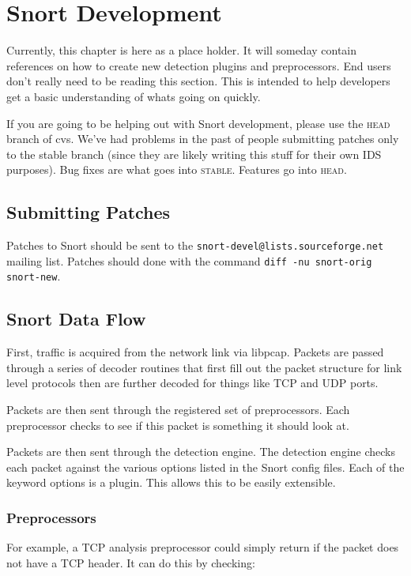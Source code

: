 \documentclass[english]{report}
\begin{document}
\chapter{Snort Development}

Currently, this chapter is here as a place holder. It will someday contain
references on how to create new detection plugins and preprocessors.  End users
don't really need to be reading this section. This is intended to help
developers get a basic understanding of whats going on quickly.

If you are going to be helping out with Snort development, please use the
\textsc{head} branch of cvs. We've had problems in the past of people
submitting patches only to the stable branch (since they are likely writing
this stuff for their own IDS purposes). Bug fixes are what goes into
\textsc{stable}. Features go into \textsc{head}.

\section{Submitting Patches}

Patches to Snort should be sent to the
\verb!snort-devel@lists.sourceforge.net!
mailing list.  Patches should done with the command
\verb!diff -nu snort-orig snort-new!.

\section{Snort Data Flow}

First, traffic is acquired from the network link via libpcap. Packets are
passed through a series of decoder routines that first fill out the packet
structure for link level protocols then are further decoded for things like TCP
and UDP ports.

Packets are then sent through the registered set of preprocessors.  Each
preprocessor checks to see if this packet is something it should look at.

Packets are then sent through the detection engine. The detection engine checks
each packet against the various options listed in the Snort config files. Each
of the keyword options is a plugin. This allows this to be easily extensible.

\subsection{Preprocessors}

For example, a TCP analysis preprocessor could simply return if the packet does
not have a TCP header. It can do this by checking: 
\end{document}
